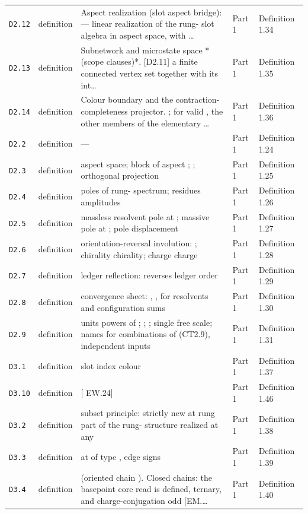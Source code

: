 \begin{longtable}{@{}p{}p{}p{}p{}p{}@{}}
\texttt{D2{.}12} & definition & Aspect realization (slot aspect bridge): — linear realization of the rung- slot algebra in aspect space, with … & Part 1 & Definition 1.34 \\
\texttt{D2{.}13} & definition & Subnetwork and microstate space *(scope clauses)*. [D2.11] a finite connected vertex set together with its int… & Part 1 & Definition 1.35 \\
\texttt{D2{.}14} & definition & Colour boundary and the contraction-completeness projector. ; for valid , the other members of the elementary … & Part 1 & Definition 1.36 \\
\texttt{D2{.}2} & definition & --- & Part 1 & Definition 1.24 \\
\texttt{D2{.}3} & definition & aspect space; block of aspect ; ; orthogonal projection & Part 1 & Definition 1.25 \\
\texttt{D2{.}4} & definition & poles of rung- spectrum; residues amplitudes & Part 1 & Definition 1.26 \\
\texttt{D2{.}5} & definition & massless resolvent pole at ; massive pole at ; pole displacement & Part 1 & Definition 1.27 \\
\texttt{D2{.}6} & definition & orientation-reversal involution: ; chirality chirality; charge charge & Part 1 & Definition 1.28 \\
\texttt{D2{.}7} & definition & ledger reflection: reverses ledger order & Part 1 & Definition 1.29 \\
\texttt{D2{.}8} & definition & convergence sheet: , , for resolvents and configuration sums & Part 1 & Definition 1.30 \\
\texttt{D2{.}9} & definition & units powers of ; ; ; single free scale; names for combinations of (CT2.9), independent inputs & Part 1 & Definition 1.31 \\
\texttt{D3{.}1} & definition & slot index colour & Part 1 & Definition 1.37 \\
\texttt{D3{.}10} & definition & [ EW.24] & Part 1 & Definition 1.46 \\
\texttt{D3{.}2} & definition & subset principle: strictly new at rung part of the rung- structure realized at any & Part 1 & Definition 1.38 \\
\texttt{D3{.}3} & definition & at of type , edge signs & Part 1 & Definition 1.39 \\
\texttt{D3{.}4} & definition & (oriented chain ). Closed chains: the basepoint core read is defined, ternary, and charge-conjugation odd [EM.… & Part 1 & Definition 1.40 \\

\end{longtable}
